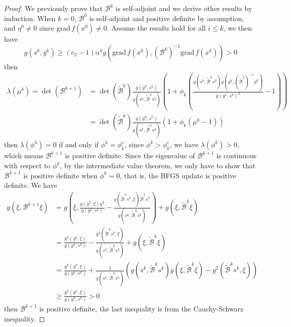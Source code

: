 \documentclass[12pt,a4paper,draft]{article}  %
\theoremstyle{definition}
\numberwithin{equation}{section}
\newcommand{\grad}{\mathrm{grad}\,}
\begin{document}
\begin{proof}
        We previously prove that $\mathcal{B}^k$ is self-adjoint and we derive other results by induction. When $k=0$, $\mathcal{B}^0$ is self-adjoint and positive definite by assumption, and $\eta^0\neq 0$ since $\grad f(x^0)\neq 0$. Assume the results hold for all $i\leq k$, we then have 
        \[
        g(s^k,y^k) \geq (c_2-1)\alpha^k g(\grad f(x^k), (\mathcal{B}^k)^{-1} \grad f(x^k)) > 0
        \]
        then
        \[
        \begin{aligned}
                  \lambda(\mu^k) = \det\left(\mathcal{B}^{k+1}\right) &= \det\left(\tilde{\mathcal{B}}^k\right)\frac{g(y^k,s^k)}{g(s^k, \tilde{\mathcal{B}}^k s^k)}\left(1 + \phi_k\left(\frac{g(s^k, \tilde{\mathcal{B}}^k s^k)g(y^k, (\tilde{\mathcal{B}}^k)^{-1} y^k)}{g(y^k,s^k)^2} - 1\right)\right)\\
                  &=  \det\left(\tilde{\mathcal{B}}^k\right)\frac{g(y^k,s^k)}{g(s^k, \tilde{\mathcal{B}}^k s^k)}\left(1 + \phi_k\left(\mu^k - 1\right)\right)
        \end{aligned}
        \]
        then $\lambda(\phi^k) = 0$ if and only if $\phi^k = \phi_k^c$, since $\phi^k > \phi_k^c$, we have $\lambda(\phi^k) > 0$, which means $\mathcal{B}^{k+1}$ is positive definite. Since the eigenvalue of $\mathcal{B}^{k+1}$ is continuous with respect to $\phi^k$, by the intermediate value theorem, we only have to show that $\mathcal{B}^{k+1}$ is positive definite when $\phi^k = 0$, that is, the BFGS update is positive definite. We have
        \[
        \begin{aligned}
                g(\xi,\mathcal{B}^{k+1}\xi) &= g\left(\xi, \frac{g(y^k,\xi)y^k}{g(y^k,s^k)} - \frac{g(\tilde{\mathcal{B}}^ks^k,\xi)\tilde{\mathcal{B}}^ks^k}{g(s^k, \tilde{\mathcal{B}}^k s^k)}\right) + g(\xi, \tilde{\mathcal{B}}^k\xi)\\
                &= \frac{g^2(y^k,\xi)}{g(y^k,s^k)} - \frac{g^2(\tilde{\mathcal{B}}^ks^k,\xi)}{g(s^k, \tilde{\mathcal{B}}^k s^k)} + g(\xi, \tilde{\mathcal{B}}^k\xi)\\
                &= \frac{g^2(y^k,\xi)}{g(y^k,s^k)} + \frac{1}{g(s^k, \tilde{\mathcal{B}}^k s^k)} \left(g(s^k, \tilde{\mathcal{B}}^k s^k)g(\xi, \tilde{\mathcal{B}}^k\xi) - g^2(\tilde{\mathcal{B}}^ks^k,\xi)\right)\\
                &\geq \frac{g^2(y^k,\xi)}{g(y^k,s^k)} > 0
        \end{aligned}
        \]
        then $\mathcal{B}^{k+1}$ is positive definite, the last inequality is from the Cauchy-Schwarz inequality. 
\end{proof}
\end{document}
